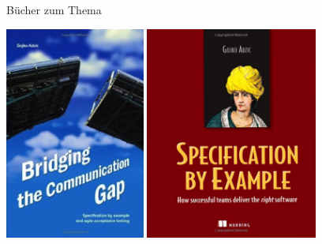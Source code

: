 \begin{frame}{Bücher zum Thema}

\begin{center}
\includegraphics[height=7cm]{CommunicationGap.png}
\hfill
\includegraphics[height=7cm]{SpecificationByExample.png}
\end{center}

\end{frame}

